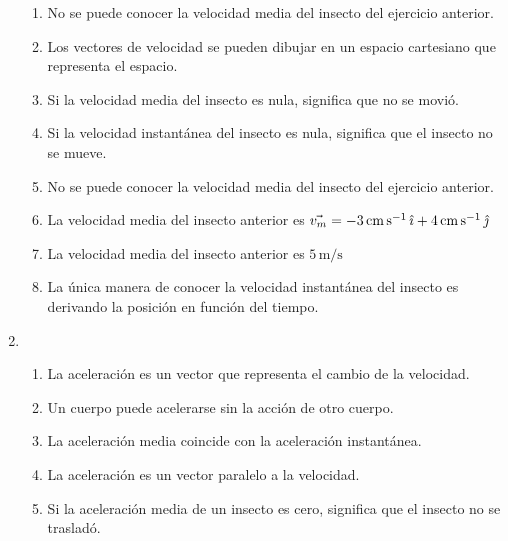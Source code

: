 \documentclass[a4paper,12pt,twoside]{book}
\begin{document}
\begin{mdframed}[style=ejercicio-conceptual]
\begin{enumerate}
\begin{enumerate}
            \item No se puede conocer la velocidad media del insecto del ejercicio anterior.

            \item Los vectores de velocidad se pueden dibujar en un espacio cartesiano que representa el espacio.

            \item Si la velocidad media del insecto es nula, significa que no se movió.

            \item Si la velocidad instantánea del insecto es nula, significa que el insecto no se mueve.

            \item No se puede conocer la velocidad media del insecto del ejercicio anterior.
            
            \item La velocidad media del insecto anterior es
            $\vec{v_m} = -3 \, \si{\centi\metre\per\second} \, \hat{\imath} + 4 \, \si{\centi\metre\per\second} \, \hat{\jmath}$

            \item La velocidad media del insecto anterior es $5 \, \si{\metre\per\second}$

            \item La única manera de conocer la velocidad instantánea del insecto es derivando la posición en función del tiempo. 
        \end{enumerate}

        \item {}
        
        \begin{enumerate}
            \item La aceleración es un vector que representa el cambio de la velocidad.

            \item Un cuerpo puede acelerarse sin la acción de otro cuerpo.

            \item La aceleración media coincide con la aceleración instantánea.
            
            \item La aceleración  es un vector paralelo a la velocidad.

            \item Si la aceleración media de un insecto es cero, significa que el insecto no se trasladó.


\end{enumerate}
\end{enumerate}
\end{mdframed}
\end{document}
